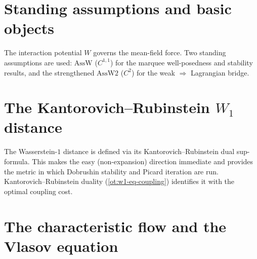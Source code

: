 


\chapter{Standing assumptions and basic objects}

The interaction potential $W$ governs the mean-field force.  Two standing assumptions are
used: $\mathrm{AssW}$ ($C^{1,1}$) for the marquee well-posedness and stability results, and the
strengthened $\mathrm{AssW2}$ ($C^2$) for the weak $\Rightarrow$ Lagrangian bridge.


\chapter[The Kantorovich--Rubinstein W1 distance]{The Kantorovich--Rubinstein $W_1$ distance}

The Wasserstein-$1$ distance is defined via its Kantorovich--Rubinstein dual sup-formula.  This
makes the easy (non-expansion) direction immediate and provides the metric in which Dobrushin
stability and Picard iteration are run.  Kantorovich--Rubinstein duality (\cref{ot:w1-eq-coupling})
identifies it with the optimal coupling cost.


\chapter{The characteristic flow and the Vlasov equation}

